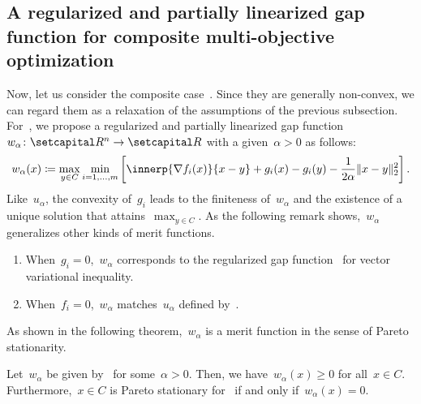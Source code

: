\documentclass[../../main]{subfiles}
\begin{document}
\subsection{A regularized and partially linearized gap function for composite multi-objective optimization} 
Now, let us consider the composite case~.
Since they are generally non-convex, we can regard them as a relaxation of the assumptions of the previous subsection.
For~, we propose a regularized and partially linearized gap function~$w_\alpha \colon \setR^n \to \setR$ with a given~$\alpha > 0$ as follows:
\begin{equation} \label{eq:reg_lin_gap_MO}
    w_\alpha(x) \coloneqq \max_{y \in C} \min_{i = 1, \dots, m} \left[ \innerp{\nabla f_i(x)}{x - y} + g_i(x) - g_i(y) - \frac{1}{2 \alpha} \norm{x - y}_2^2 \right] 
.\end{equation} 
Like~$u_\alpha$, the convexity of~$g_i$ leads to the finiteness of~$w_\alpha$ and the existence of a unique solution that attains~$\max_{y \in C}$.
As the following remark shows,~$w_\alpha$ generalizes other kinds of merit functions.
\begin{remark} 
    \begin{enumerate}
        \item When~$g_i = 0$,~$w_\alpha$ corresponds to the regularized gap function~ for vector variational inequality. 
        \item When~$f_i = 0$,~$w_\alpha$ matches~$u_\alpha$ defined by~. 
    \end{enumerate}
\end{remark}
As shown in the following theorem,~$w_\alpha$ is a merit function in the sense of Pareto stationarity.
\begin{theorem} 
    Let~$w_\alpha$ be given by~ for some~$\alpha > 0$.
    Then, we have~$w_\alpha(x) \ge 0$ for all~$x \in C$.
    Furthermore,~$x \in C$ is Pareto stationary for~ if and only if~$w_\alpha(x) = 0$.
\end{theorem}
\end{document}
